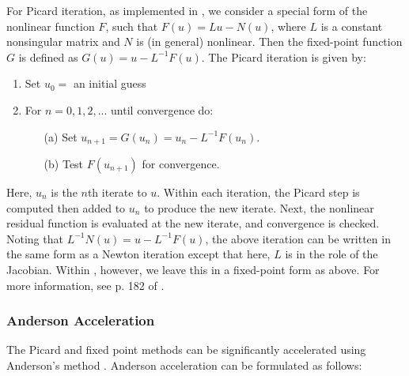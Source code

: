 
For Picard iteration, as implemented in {\kinsol}, we consider a special form
of the nonlinear function $F$, such that $F(u) = Lu - N(u)$, where $L$ is a constant
nonsingular matrix and $N$ is (in general) nonlinear.  Then the fixed-point
function $G$ is defined as $G(u) = u - L^{-1}F(u)$.
The Picard iteration is given by:

\vspace{1ex}
\begin{enumerate}
   \item Set $u_0 = $ an initial guess
   \item For $n = 0, 1, 2,...$ until convergence do:
      \begin{itemize}
          \item[(a)] Set $u_{n+1} = G(u_n) = u_n - L^{-1}F(u_n)$.
          \item[(b)] Test $F(u_{n+1})$ for convergence.
      \end{itemize}
\end{enumerate}
Here, $u_n$ is the $n$th iterate to $u$.
Within each iteration, the Picard step is computed then added to $u_n$ to produce
the new iterate.  Next, the nonlinear residual
function is evaluated at the new iterate, and convergence is checked.
Noting that $L^{-1}N(u) = u - L^{-1}F(u)$, the above iteration can be written in the same form
as a Newton iteration except that here, $L$ is in the role of the Jacobian.
Within {\kinsol}, however, we leave this in a fixed-point form as above.
For more information, see p. 182 of \cite{Ortega-Rheinbolt00}.



\subsubsection*{Anderson Acceleration}
The Picard and fixed point methods can be significantly accelerated using
Anderson's method \cite{Anderson65, Walker-Ni09, Fang-Saad09, LWWY11}.
Anderson acceleration can be formulated as follows:

